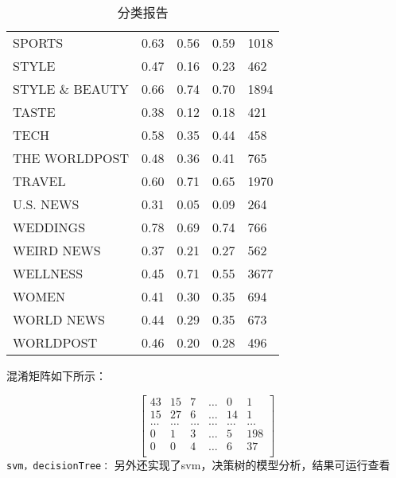 \documentclass{article}
\begin{document}
\begin{table}[h]
\begin{tabular}{|l|l|l|l|l|}
    SPORTS & 0.63 & 0.56 & 0.59 & 1018 \\
    STYLE & 0.47 & 0.16 & 0.23 & 462 \\
    STYLE \& BEAUTY & 0.66 & 0.74 & 0.70 & 1894 \\
    TASTE & 0.38 & 0.12 & 0.18 & 421 \\
    TECH & 0.58 & 0.35 & 0.44 & 458 \\
    THE WORLDPOST & 0.48 & 0.36 & 0.41 & 765 \\
    TRAVEL & 0.60 & 0.71 & 0.65 & 1970 \\
    U.S. NEWS & 0.31 & 0.05 & 0.09 & 264 \\
    WEDDINGS & 0.78 & 0.69 & 0.74 & 766 \\
    WEIRD NEWS & 0.37 & 0.21 & 0.27 & 562 \\
    WELLNESS & 0.45 & 0.71 & 0.55 & 3677 \\
    WOMEN & 0.41 & 0.30 & 0.35 & 694 \\
    WORLD NEWS & 0.44 & 0.29 & 0.35 & 673 \\
    WORLDPOST & 0.46 & 0.20 & 0.28 & 496 \\
    \hline
    \end{tabular}
    \caption{分类报告}
\end{table}



混淆矩阵如下所示：

\[
\begin{bmatrix}
    43 & 15 & 7 & \ldots & 0 & 1 \\
    15 & 27 & 6 & \ldots & 14 & 1 \\
    \ldots & \ldots & \ldots & \ldots & \ldots & \ldots \\
    0 & 1 & 3 & \ldots & 5 & 198 \\
    0 & 0 & 4 & \ldots & 6 & 37 \\
\end{bmatrix}
\]
\texttt{svm，decisionTree：}
另外还实现了svm，决策树的模型分析，结果可运行查看
\end{document}
